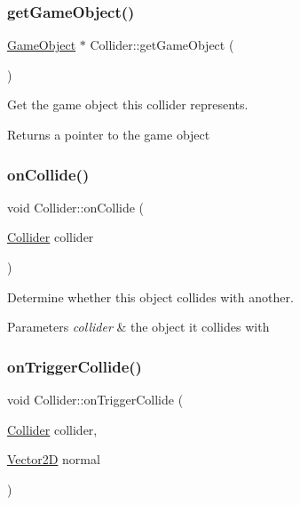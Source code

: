 \subsubsection{\texorpdfstring{get\+Game\+Object()}{getGameObject()}}
{\footnotesize\ttfamily \mbox{\hyperlink{class_game_object}{Game\+Object}} $\ast$ Collider\+::get\+Game\+Object (\begin{DoxyParamCaption}{ }\end{DoxyParamCaption})}



Get the game object this collider represents. 

\begin{DoxyReturn}{Returns}
a pointer to the game object 
\end{DoxyReturn}
\mbox{\label{class_collider_a76e3c5867ef3ecd2057b9c091940abee}} 
\subsubsection{\texorpdfstring{on\+Collide()}{onCollide()}}
{\footnotesize\ttfamily void Collider\+::on\+Collide (\begin{DoxyParamCaption}\item[{\mbox{\hyperlink{class_collider}{Collider}}}]{collider }\end{DoxyParamCaption})}



Determine whether this object collides with another. 


\begin{DoxyParams}{Parameters}
{\em collider} & the object it collides with \\
\hline
\end{DoxyParams}
\mbox{\label{class_collider_ae17ec8f9110acbc4df79d5addf8ac401}} 
\subsubsection{\texorpdfstring{on\+Trigger\+Collide()}{onTriggerCollide()}}
{\footnotesize\ttfamily void Collider\+::on\+Trigger\+Collide (\begin{DoxyParamCaption}\item[{\mbox{\hyperlink{class_collider}{Collider}}}]{collider,  }\item[{\mbox{\hyperlink{struct_vector2_d}{Vector2D}}}]{normal }\end{DoxyParamCaption})\hspace{0.3cm}{\ttfamily [virtual]}}



